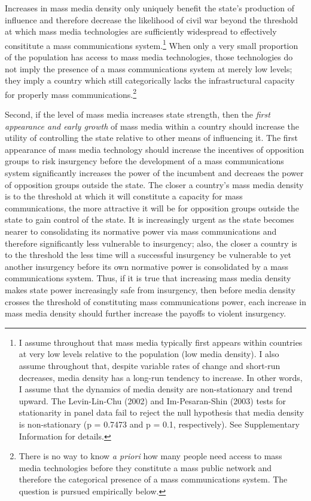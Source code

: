 \documentclass[11pt,article,oneside]{memoir}
\begin{document}
Increases in mass media density only uniquely benefit the state's
production of influence and therefore decrease the likelihood of civil
war beyond the threshold at which mass media technologies are
sufficiently widespread to effectively consititute a mass communications
system.\footnote{I assume throughout that mass media typically first
  appears within countries at very low levels relative to the population
  (low media density). I also assume throughout that, despite variable
  rates of change and short-run decreases, media density has a long-run
  tendency to increase. In other words, I assume that the dynamics of
  media density are non-stationary and trend upward. The Levin-Lin-Chu
  (2002) and Im-Pesaran-Shin (2003) tests for stationarity in panel data
  fail to reject the null hypothesis that media density is
  non-stationary (p = 0.7473 and p = 0.1, respectively). See
  Supplementary Information for details.} When only a very small
proportion of the population has access to mass media technologies,
those technologies do not imply the presence of a mass communications
system at merely low levels; they imply a country which still
categorically lacks the infrastructural capacity for properly mass
communications.\footnote{There is no way to know \emph{a priori} how
  many people need access to mass media technologies before they
  constitute a mass public network and therefore the categorical
  presence of a mass communications system. The question is pursued
  empirically below.}

Second, if the level of mass media increases state strength, then the
\emph{first appearance and early growth} of mass media within a country
should increase the utility of controlling the state relative to other
means of influencing it. The first appearance of mass media technology
should increase the incentives of opposition groups to risk insurgency
before the development of a mass communications system significantly
increases the power of the incumbent and decreaes the power of
opposition groups outside the state. The closer a country's mass media
density is to the threshold at which it will constitute a capacity for
mass communications, the more attractive it will be for opposition
groups outside the state to gain control of the state. It is
increasingly urgent as the state becomes nearer to consolidating its
normative power via mass communications and therefore significantly less
vulnerable to insurgency; also, the closer a country is to the threshold
the less time will a successful insurgency be vulnerable to yet another
insurgency before its own normative power is consolidated by a mass
communications system. Thus, if it is true that increasing mass media
density makes state power increasingly safe from insurgency, then before
media density crosses the threshold of constituting mass communications
power, each increase in mass media density should further increase the
payoffs to violent insurgency.
\end{document}
